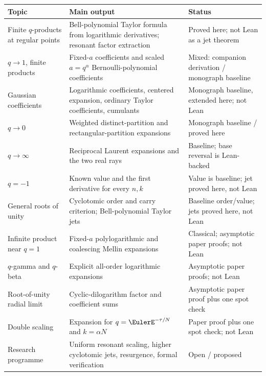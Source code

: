 \documentclass[11pt,oneside]{article}
\theoremstyle{definition}
\theoremstyle{remark}
\begin{document}
\begin{longtable}{@{}>{\raggedright\arraybackslash}p{}
                  >{\raggedright\arraybackslash}p{}
                  >{\raggedright\arraybackslash}p{}@{}}
\toprule
Topic & Main output & Status\\
\midrule
\endhead
Finite $q$-products at regular points & Bell-polynomial Taylor formula from logarithmic derivatives; resonant factor extraction & Proved here; not Lean as a jet theorem\\
$q\to1$, finite products & Fixed-$a$ coefficients and scaled $a=q^\alpha$ Bernoulli-polynomial coefficients & Mixed: companion derivation / monograph baseline\\
Gaussian coefficients & Logarithmic coefficients, centered expansion, ordinary Taylor coefficients, cumulants & Monograph baseline, extended here; not Lean\\
$q\to0$ & Weighted distinct-partition and rectangular-partition expansions & Monograph baseline / proved here\\
$q\to\infty$ & Reciprocal Laurent expansions and the two real rays & Baseline; base reversal is Lean-backed\\
$q=-1$ & Known value and the first derivative for every $n,k$ & Value is baseline; jet proved here, not Lean\\
General roots of unity & Cyclotomic order and carry criterion; Bell-polynomial Taylor jets & Baseline order/value; jets proved here, not Lean\\
Infinite product near $q=1$ & Fixed-$a$ polylogarithmic and coalescing Mellin expansions & Classical; asymptotic paper proofs; not Lean\\
$q$-gamma and $q$-beta & Explicit all-order logarithmic expansions & Asymptotic paper proofs; not Lean\\
Root-of-unity radial limit & Cyclic-dilogarithm factor and coefficient sums & Asymptotic paper proof plus one spot check\\
Double scaling & Expansion for $q=\EulerE^{-\tau/N}$ and $k=\alpha N$ & Paper proof plus one spot check; not Lean\\
Research programme & Uniform resonant scaling, higher cyclotomic jets, resurgence, formal verification & Open / proposed\\
\bottomrule
\end{longtable}
\end{document}
